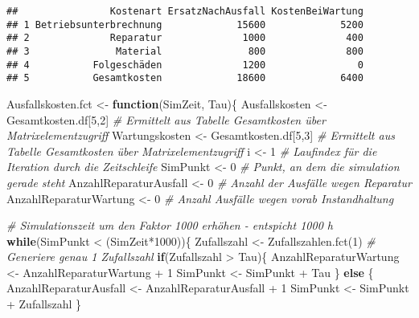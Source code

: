 \documentclass[
]{article}
\newenvironment{Shaded}{\begin{snugshade}}{\end{snugshade}}
\newcommand{\CommentTok}[1]{\textcolor[rgb]{0.56,0.35,0.01}{\textit{#1}}}
\newcommand{\ControlFlowTok}[1]{\textcolor[rgb]{0.13,0.29,0.53}{\textbf{#1}}}
\newcommand{\DecValTok}[1]{\textcolor[rgb]{0.00,0.00,0.81}{#1}}
\newcommand{\FunctionTok}[1]{\textcolor[rgb]{0.00,0.00,0.00}{#1}}
\newcommand{\NormalTok}[1]{#1}
\newcommand{\OtherTok}[1]{\textcolor[rgb]{0.56,0.35,0.01}{#1}}
\newcommand{\SpecialCharTok}[1]{\textcolor[rgb]{0.00,0.00,0.00}{#1}}
\begin{document}
\begin{verbatim}
##                Kostenart ErsatzNachAusfall KostenBeiWartung
## 1 Betriebsunterbrechnung             15600             5200
## 2              Reparatur              1000              400
## 3               Material               800              800
## 4           Folgeschäden              1200                0
## 5           Gesamtkosten             18600             6400
\end{verbatim}

\begin{Shaded}
\begin{Highlighting}[]
\NormalTok{Ausfallskosten.fct }\OtherTok{\textless{}{-}} \ControlFlowTok{function}\NormalTok{(SimZeit, Tau)\{}
\NormalTok{  Ausfallskosten }\OtherTok{\textless{}{-}}\NormalTok{ Gesamtkosten.df[}\DecValTok{5}\NormalTok{,}\DecValTok{2}\NormalTok{]    }\CommentTok{\# Ermittelt aus Tabelle Gesamtkosten über Matrixelementzugriff}
\NormalTok{  Wartungskosten }\OtherTok{\textless{}{-}}\NormalTok{ Gesamtkosten.df[}\DecValTok{5}\NormalTok{,}\DecValTok{3}\NormalTok{]    }\CommentTok{\# Ermittelt aus Tabelle Gesamtkosten über Matrixelementzugriff}
\NormalTok{  i }\OtherTok{\textless{}{-}} \DecValTok{1}          \CommentTok{\# Laufindex für die Iteration durch die Zeitschleife}
\NormalTok{  SimPunkt }\OtherTok{\textless{}{-}} \DecValTok{0}   \CommentTok{\# Punkt, an dem die simulation gerade steht}
\NormalTok{  AnzahlReparaturAusfall }\OtherTok{\textless{}{-}} \DecValTok{0}     \CommentTok{\# Anzahl der Ausfälle wegen Reparatur}
\NormalTok{  AnzahlReparaturWartung }\OtherTok{\textless{}{-}} \DecValTok{0}     \CommentTok{\# Anzahl Ausfälle wegen vorab Instandhaltung}
  
  \CommentTok{\# Simulationszeit um den Faktor 1000 erhöhen {-} entspicht 1000 h  }
  \ControlFlowTok{while}\NormalTok{(SimPunkt }\SpecialCharTok{\textless{}}\NormalTok{ (SimZeit}\SpecialCharTok{*}\DecValTok{1000}\NormalTok{))\{}
\NormalTok{    Zufallszahl }\OtherTok{\textless{}{-}} \FunctionTok{Zufallszahlen.fct}\NormalTok{(}\DecValTok{1}\NormalTok{)   }\CommentTok{\# Generiere genau 1 Zufallszahl}
    \ControlFlowTok{if}\NormalTok{(Zufallszahl }\SpecialCharTok{\textgreater{}}\NormalTok{ Tau)\{}
\NormalTok{      AnzahlReparaturWartung }\OtherTok{\textless{}{-}}\NormalTok{ AnzahlReparaturWartung }\SpecialCharTok{+} \DecValTok{1}
\NormalTok{      SimPunkt }\OtherTok{\textless{}{-}}\NormalTok{ SimPunkt }\SpecialCharTok{+}\NormalTok{ Tau}
\NormalTok{    \} }\ControlFlowTok{else}\NormalTok{ \{}
\NormalTok{      AnzahlReparaturAusfall }\OtherTok{\textless{}{-}}\NormalTok{ AnzahlReparaturAusfall }\SpecialCharTok{+} \DecValTok{1}
\NormalTok{      SimPunkt }\OtherTok{\textless{}{-}}\NormalTok{ SimPunkt }\SpecialCharTok{+}\NormalTok{ Zufallszahl}
\NormalTok{    \}}
      

\end{Highlighting}
\end{Shaded}
\end{document}
